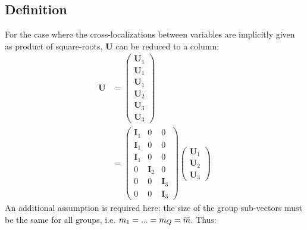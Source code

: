 \documentclass[12pt]{scrartcl}
\newcommand{\overbar}[1]{\mkern 1.5mu\overline{\mkern-1.5mu#1\mkern-1.5mu}\mkern 1.5mu}
\begin{document}
\subsection{Definition}
For the case where the cross-localizations between variables are implicitly given as product of square-roots, $\mathbf{U}$ can be reduced to a column:
\begin{align}
\mathbf{U} & = \left( \begin{array}{c}
\mathbf{U}_1 \\
\mathbf{U}_1 \\
\mathbf{U}_1 \\[0.3ex]
\hline
\mathbf{U}_2 \\[0.3ex]
\hline
\mathbf{U}_3 \\
\mathbf{U}_3
\end{array} \right) \nonumber \\
& = \left( \begin{array}{c|c|c}
\mathbf{I}_1 & 0 & 0 \\
\mathbf{I}_1 & 0 & 0 \\
\mathbf{I}_1 & 0 & 0 \\[0.3ex]
\hline
0 & \mathbf{I}_2 & 0 \\[0.3ex]
\hline
0 & 0 & \mathbf{I}_3 \\
0 & 0 & \mathbf{I}_3
\end{array} \right)
\left( \begin{array}{c}
\mathbf{U}_1 \\[0.3ex]
\hline
\mathbf{U}_2 \\[0.3ex]
\hline
\mathbf{U}_3
\end{array} \right)
\end{align}
An additional assumption is required here: the size of the group sub-vectors must be the same for all groups, i.e. $m_1 = ... = m_Q = \overbar{m}$. Thus:
\end{document}
